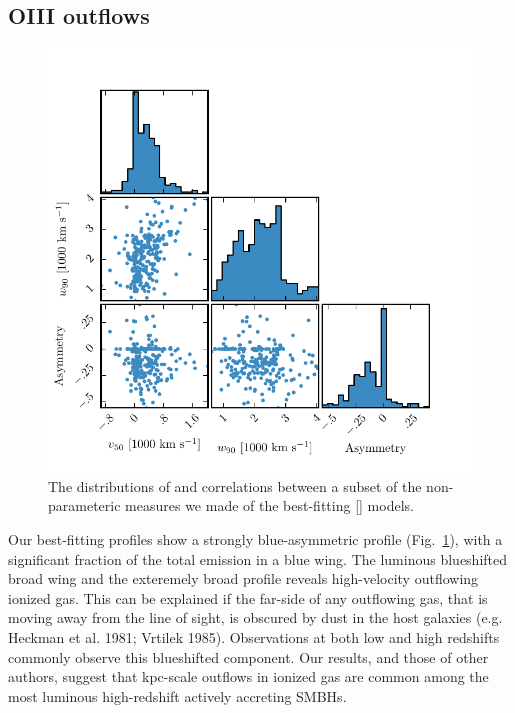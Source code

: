 \subsection{OIII outflows}

\begin{figure}
    \includegraphics[width=\columnwidth]{figures/chapter04/parameters_grid.pdf} 
    \caption{The distributions of and correlations between a subset of the non-parameteric measures we made of the best-fitting [] models.}     
    \label{fig:parameters_grid}
\end{figure}

Our best-fitting profiles show a strongly blue-asymmetric profile (Fig.~\ref{fig:parameters_grid}), with a significant fraction of the total emission in a blue wing.
The luminous blueshifted broad wing and the exteremely broad profile reveals high-velocity outflowing ionized gas. 
This can be explained if the far-side of any outflowing gas, that is moving away from the line of sight, is obscured by dust in the host galaxies (e.g. Heckman et al. 1981; Vrtilek 1985). 
Observations at both low and high redshifts commonly observe this blueshifted component.  
Our results, and those of other authors, suggest that kpc-scale outflows in ionized gas are common among the most luminous high-redshift actively accreting SMBHs.

